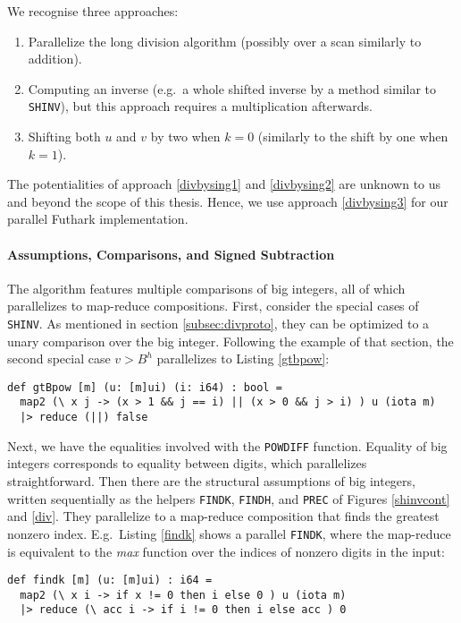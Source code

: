 We recognise three approaches:
\begin{enumerate}
\item Parallelize the long division algorithm (possibly over a scan similarly to
  addition).\label{divbysing1}
\item Computing an inverse (e.g.\ a whole shifted inverse by a method similar to
  \texttt{SHINV}), but this approach requires a multiplication
  afterwards.\label{divbysing2}
\item Shifting both $u$ and $v$ by two when $k = 0$ (similarly to the shift by
  one when $k=1$).\label{divbysing3}
\end{enumerate}

The potentialities of approach \ref{divbysing1} and \ref{divbysing2} are unknown
to us and beyond the scope of this thesis. Hence, we use approach
\ref{divbysing3} for our parallel Futhark implementation.

\paragraph{Assumptions, Comparisons, and Signed Subtraction}
The algorithm features multiple comparisons of big integers, all of which
parallelizes to map-reduce compositions. First, consider the special cases of
\texttt{SHINV}. As mentioned in section \ref{subsec:divproto}, they can be
optimized to a unary comparison over the big integer. Following the example of
that section, the second special case $v > B^h$ parallelizes to Listing
\ref{gtbpow}:
\begin{lstlisting}[language=futhark,caption={\footnotesize Futhark function to check $u > B^i$ in parallel for big integer $u$ in base $B$ from file \texttt{div.fut}.},label={gtbpow},firstnumber=29]
def gtBpow [m] (u: [m]ui) (i: i64) : bool =
  map2 (\ x j -> (x > 1 && j == i) || (x > 0 && j > i) ) u (iota m)
  |> reduce (||) false
\end{lstlisting}
Next, we have the equalities involved with the \texttt{POWDIFF}
function. Equality of big integers corresponds to equality between digits, which
parallelizes straightforward. Then there are the structural assumptions of big
integers, written sequentially as the helpers \texttt{FINDK}, \texttt{FINDH},
and \texttt{PREC} of Figures \ref{shinvcont} and \ref{div}. They parallelize to a map-reduce
composition that finds the greatest nonzero index. E.g.\ Listing \ref{findk}
shows a parallel \texttt{FINDK}, where the map-reduce is equivalent to the
\textit{max} function over the indices of nonzero digits in the input:
\begin{lstlisting}[language=futhark,caption={\footnotesize Futhark function to find $i$ for big integer $u$ in base $B$ s.t.\ $B^i \leq u < B^{i+1}$ from file \texttt{div.fut}.},label={findk},firstnumber=39]
def findk [m] (u: [m]ui) : i64 =
  map2 (\ x i -> if x != 0 then i else 0 ) u (iota m)
  |> reduce (\ acc i -> if i != 0 then i else acc ) 0
\end{lstlisting}


